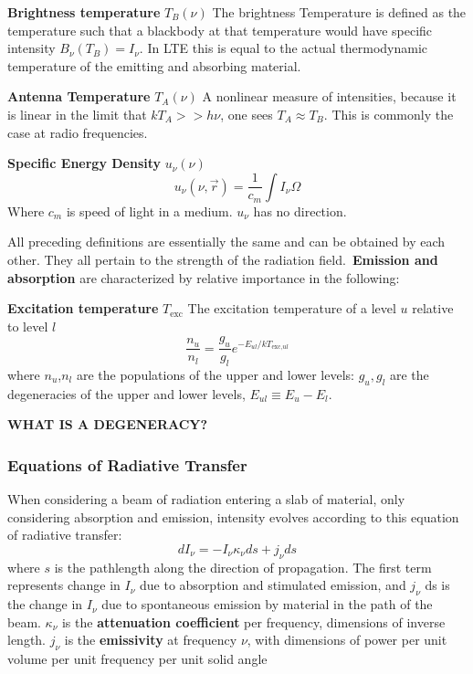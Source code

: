 \textbf{Brightness temperature} $ T_{B}(\nu) $ 
The brightness Temperature is defined as the temperature such that a blackbody at that temperature would have specific intensity $ B_{\nu}(T_{B}) = I_{\nu} $. In LTE this is equal to the actual thermodynamic temperature of the emitting and absorbing material.

\textbf{Antenna Temperature} $ T_{A}(\nu) $  A nonlinear measure of intensities, because it is linear in the limit that $ kT_{A}>>h\nu $, one sees $ T_{A}\approx T_{B} $. This is commonly the case at radio frequencies.

\textbf{Specific Energy Density} $ u_{\nu}(\nu) $ 
\begin{equation}
  u_{\nu}(\nu,\vec{r}) = \frac{1}{c_{m}}\int I_{\nu}\Omega
\end{equation}
Where $ c_{m} $ is speed of light in a medium. $ u_{\nu} $ has no direction.


All preceding definitions are essentially the same and can be obtained by each other. They all pertain to the strength of the radiation field.\ \textbf{Emission and absorption} are characterized by relative importance in the following:

\textbf{Excitation temperature} $ T_{ \text{exc}} $ 
The excitation temperature of a level $ u $ relative to level $ l $ 
\begin{equation}
  \frac{n_{u}}{n_{l}} = \frac{g_{u}}{g_{l}}e^{-E_{ul}/kT_{\text{exc,}ul}}
\end{equation}
where $ n_{u} $,$ n_{l} $ are the populations of the upper and lower levels: $ g_{u},g_{l} $ are the degeneracies of the upper and lower levels, $ E_{ul}\equiv E_{u}-E_{l}$.

\textbf{WHAT IS A DEGENERACY?}

\subsubsection{Equations of Radiative Transfer}
When considering a beam of radiation entering a slab of material, only considering absorption and emission, intensity evolves according to this equation of radiative transfer:
\begin{equation}
  dI_{\nu}= -I_{\nu}\kappa_{\nu}ds + j_{\nu}ds
\end{equation}
where $ s $ is the pathlength along the direction of propagation. The first term represents change in $ I_{\nu} $ due to absorption and stimulated emission, and $ j_{\nu} $ ds is the change in $ I_{\nu} $ due to spontaneous emission by material in the path of the beam. $ \kappa_{\nu} $ is the \textbf{attenuation coefficient} per frequency, dimensions of inverse length. $ j_{\nu} $ is the \textbf{emissivity} at frequency $ \nu $, with dimensions of power per unit volume per unit frequency per unit solid angle

